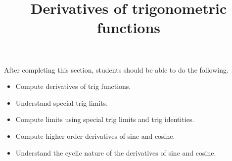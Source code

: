 \documentclass{ximera}
\title{Derivatives of trigonometric functions}
\begin{document}
\begin{abstract}
\end{abstract}

\maketitle

\begin{sectionOutcomes}

After completing this section, students should be able to do the following.

\begin{itemize}
	\item Compute derivatives of trig functions.
	\item Understand special trig limits.
	\item Compute limits using special trig limits and trig identities.
	\item Compute higher order derivatives of sine and cosine.
	\item Understand the cyclic nature of the derivatives of sine and cosine.
\end{itemize}

\end{sectionOutcomes}
\end{document}

